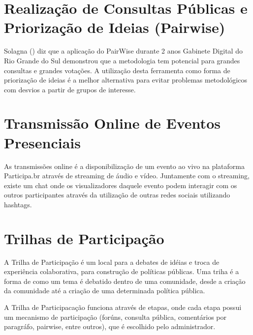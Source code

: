 \section*{Realização de Consultas Públicas e Priorização de Ideias (Pairwise)}


Solagna (\citeyear{solagna2014metodologias}) diz que a aplicação do PairWise durante 2 anos Gabinete Digital do Rio Grande do Sul demonstrou que a metodologia tem potencial para grandes consultas e grandes votações. A utilização desta ferramenta como forma de priorização de ideias é a melhor alternativa para evitar problemas metodológicos com desvios a partir de grupos de interesse.

\section*{Transmissão Online de Eventos Presenciais}

As transmissões online é a disponibilização de um evento ao vivo na plataforma Participa.br através de streaming de áudio e vídeo. Juntamente com o streaming, existe um chat onde os visualizadores daquele evento podem interagir com os outros participantes através da utilização de outras redes sociais utilizando hashtags.

\section*{Trilhas de Participação}

A Trilha de Participação é um local para a debates de idéias e troca de experiência colaborativa, para construção de políticas públicas. Uma triha é a forma de como um tema é debatido dentro de uma comunidade, desde a criação da comunidade até a criação de uma determinada política pública.

A Trilha de Participacação funciona através de etapas, onde cada etapa possui um mecanismo de participação (forúns, consulta pública, comentários por paragráfo, pairwise, entre outros), que é escolhido pelo administrador. 
